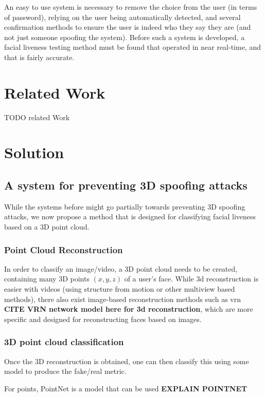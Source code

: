 \documentclass[10pt,a4paper]{article}
\begin{document}
    An easy to use system is necessary to remove the choice from the user (in terms of password), relying on the user being automatically
    detected, and several confirmation methods to ensure the user is indeed who they say they are (and not just someone spoofing the system).
    Before such a system is developed, a facial liveness testing method must be found that operated in near real-time, and that is fairly accurate.


\section{Related Work}
    TODO related Work

\section{Solution}

    \subsection{A system for preventing 3D spoofing attacks}
        While the systems before might go partially towards preventing 3D spoofing attacks, we now propose a method
        that is designed for classifying facial liveness based on a 3D point cloud.

        \subsubsection{Point Cloud Reconstruction}
            In order to classify an image/video, a 3D point cloud needs to be created, containing many 3D points $(x,y,z)$
            of a user's face. While 3d reconstruction is easier with videos (using structure from motion or other multiview based methods),
            there also exist image-based reconstruction methods such as vrn \textbf{CITE VRN network model here for 3d reconstruction}, which are
            more specific and designed for reconstructing faces based on images.

        \subsubsection{3D point cloud classification}
            Once the 3D reconstruction is obtained, one can then classify this using some model to produce the fake/real metric.

            For points, PointNet is a model that can be used \textbf{EXPLAIN POINTNET}
\end{document}

